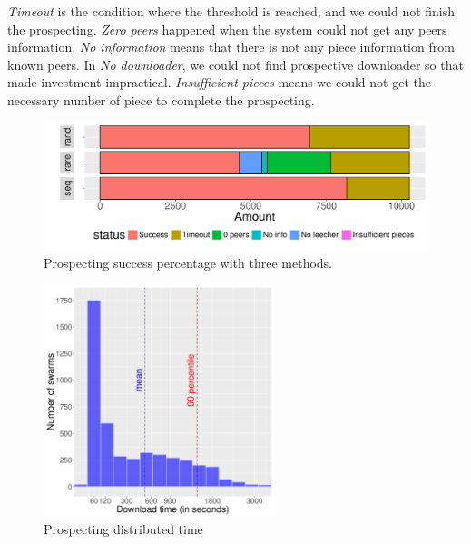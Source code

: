 \textit{Timeout} is the condition where the threshold is reached, and we could not finish the prospecting. \textit{Zero peers} happened when the system could not get any peers information. \textit{No information} means that there is not any piece information from known peers. In \textit{No downloader}, we could not find prospective downloader so that made investment impractical. \textit{Insufficient pieces} means we could not get the necessary number of piece to complete the prospecting.

\begin{figure}[h]
	\centering
	\includegraphics[width=\textwidth]{pics/results/dpredown_merge.pdf}
	\caption{Prospecting success percentage with three methods.}
	\label{fig:predownprecent}
\end{figure}

\begin{figure}[h]
	\centering
	\includegraphics[width=0.6\textwidth]{pics/results/hpredown.pdf}
	\caption{Prospecting distributed time}
	\label{fig:predownhist}
\end{figure}

